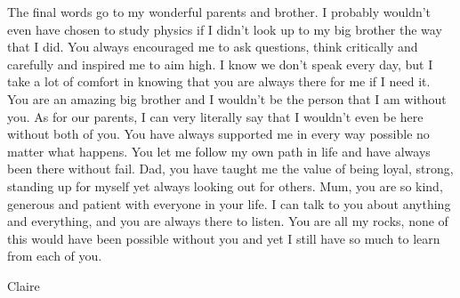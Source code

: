 The final words go to my wonderful parents and brother. I probably wouldn’t even have chosen to study physics if I didn’t look up to my big brother the way that I did. You always encouraged me to ask questions, think critically and carefully and inspired me to aim high. I know we don’t speak every day, but I take a lot of comfort in knowing that you are always there for me if I need it. You are an amazing big brother and I wouldn’t be the person that I am without you. As for our parents, I can very literally say that I wouldn’t even be here without both of you. You have always supported me in every way possible no matter what happens. You let me follow my own path in life and have always been there without fail. Dad, you have taught me the value of being loyal, strong, standing up for myself yet always looking out for others. Mum, you are so kind, generous and patient with everyone in your life. I can talk to you about anything and everything, and you are always there to listen. You are all my rocks, none of this would have been possible without you and yet I still have so much to learn from each of you.

\raggedleft
Claire




